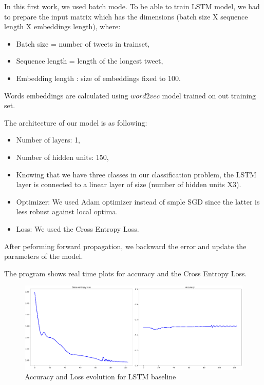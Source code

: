 \documentclass[a4paper,english,12pt]{article}
\begin{document}
In this first work, we used batch mode. To be able to train LSTM model, we had to prepare the input matrix which has the dimensions (batch size X sequence length X embeddings length), where:

\begin{itemize}
	\item Batch size = number of tweets in trainset,
	\item Sequence length = length of the longest tweet,
	\item Embedding length : size of embeddings fixed to 100.
\end{itemize}

Words embeddings are calculated using $word2vec$ model trained on out training set.


The architecture of our model is as following:
\begin{itemize}
	\item Number of layers: 1,
	\item Number of hidden units: 150,
	\item Knowing that we have three classes in our classification problem, the LSTM layer is connected to a linear layer of size (number of hidden units X3).
	\item Optimizer: We used Adam optimizer instead of smple SGD since the latter is less robust against local optima.
	\item Loss: We used the Cross Entropy Loss. 
\end{itemize}

After peforming forward propagation, we backward the error and update the parameters of the model.

The program shows real time plots for accuracy and the Cross Entropy Loss.

\begin{figure}[H]
\centering
\includegraphics[scale=0.85]{acc_loss}
\caption{Accuracy and Loss evolution for LSTM baseline}
\end{figure}
\end{document}
